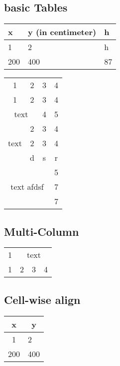 \documentclass{article}
\begin{document}
\subsection{basic Tables}

\begin{tabular}{|m{3cm}| m{2cm}|m{2cm}|}
    \hline
    \textbf{x} & \textbf{y} \textbf{(in centimeter)} & \textbf{h} \\
    \hline
    {1} & 2 & h\\
    \hline
    200 & 400 & 87 \\
    \hline
    
\end{tabular}


\begin{tabular}{|c|c|c|c|}
    \hline
	1 & 2 & 3 & 4 \\ 
	\cline{1-1}\cline{3-4}
	1 & 2 & 3 & 4  \\
	\hline
	\multicolumn{2}{|c|}{text} & 4 & 5 \\
	\hline
	\multirow{3}{*}{text} & 2 & 3 & 4 \\
	\cline{2-4}
	& 2 & 3 & 4 \\
	& d & s & r \\
	\hline
	\multicolumn{3}{|c|}{\multirow{3}{*}{text afdsf}} & 5 \\
	\multicolumn{3}{|c|}{} & 7 \\
	\multicolumn{3}{|c|}{} & 7 \\
	\hline

\end{tabular}

\subsection{Multi-Column}
\begin{tabular}{|c|ccc|}
    \hline
    1 & \multicolumn{3}{c|}{text} \\
    \cline{2-4}
    1 & 2 & 3 & 4 \\

    \hline
\end{tabular}

\subsection{Cell-wise align}
\begin{tabular}{|c | c|}
    \hline
    x & y \\
    \hline
    1 & \multicolumn{1}{l|}{2} \\
    200 & 400 \\
    \hline
\end{tabular}
\end{document}
